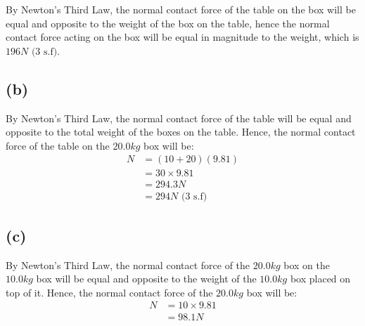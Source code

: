 \documentclass[11pt]{article}
\begin{document}
By Newton's Third Law, the normal contact force of the table on the box will be equal and opposite to the weight of the box on the table, hence the normal contact force acting on the box will be equal in magnitude to the weight, which is \(196 \si{N} \text{ (3 s.f)}\).

\subsection{(b)}
\label{sec:org1947721}
By Newton's Third Law, the normal contact force of the table will be equal and opposite to the total weight of the boxes on the table. Hence, the normal contact force of the table on the \(20.0 \si{kg}\) box will be:
\begin{align*}
N &= (10 + 20)(9.81) \\
&= 30 \times 9.81 \\
&= 294.3 \si{N} \\
&= 294 \si{N} \text{ (3 s.f)}
\end{align*}

\newpage

\subsection{(c)}
\label{sec:org40ce0ee}
By Newton's Third Law, the normal contact force of the \(20.0 \si{kg}\) box on the \(10.0 \si{kg}\) box will be equal and opposite to the weight of the \(10.0 \si{kg}\) box placed on top of it. Hence, the normal contact force of the \(20.0 \si{kg}\) box will be:
\begin{align*}
N &= 10 \times 9.81 \\
&= 98.1 \si{N}
\end{align*}
\end{document}
